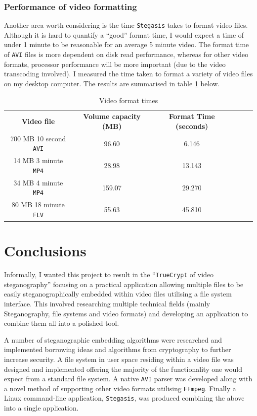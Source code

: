 \documentclass[paper=a4, fontsize=11pt,twoside]{scrartcl}
\numberwithin{table}{section}
\numberwithin{figure}{section}
\numberwithin{algorithm}{section}
\begin{document}
\subsubsection{Performance of video formatting}

Another area worth considering is the time \texttt{Stegasis} takes to format video files. Although it is hard to quantify a ``good'' format time, I would expect a time of under 1 minute to be reasonable for an average 5 minute video. The format time of \texttt{AVI} files is more dependent on disk read performance, whereas for other video formats, processor performance will be more important (due to the video transcoding involved). I measured the time taken to format a variety of video files on my desktop computer. The results are summarised in table \ref{formatres} below.

\begin{table}[h]
\centering
\begin{tabular}{|c|c|c|lll}
\cline{1-3}
\textbf{Video file} & \textbf{Volume capacity (MB)} & \textbf{Format Time (seconds)}      \\ \cline{1-3}
700 MB 10 second \texttt{AVI} & 96.60 & 6.146   \\ \cline{1-3}
14 MB 3 minute \texttt{MP4} & 28.98 & 13.143   \\ \cline{1-3}
34 MB 4 minute \texttt{MP4} & 159.07 & 29.270   \\ \cline{1-3}
80 MB 18 minute \texttt{FLV} & 55.63 & 45.810  \\ \cline{1-3}
\end{tabular}
\caption{Video format times}
\label{formatres}
\end{table}

\vfill
\pagebreak

\section{Conclusions}

Informally, I wanted this project to result in the ``\texttt{TrueCrypt} of video steganography'' focusing on a practical application allowing multiple files to be easily steganographically embedded within video files utilising a file system interface. This involved researching multiple technical fields (mainly Steganography, file systems and video formats) and developing an application to combine them all into a polished tool.

A number of steganographic embedding algorithms were researched and implemented borrowing ideas and algorithms from cryptography to further increase security. A file system in user space residing within a video file was designed and implemented offering the majority of the functionality one would expect from a standard file system. A native \texttt{AVI} parser was developed along with a novel method of supporting other video formats utilising \texttt{FFmpeg}. Finally a Linux command-line application, \texttt{Stegasis}, was produced combining the above into a single application.
\end{document}
